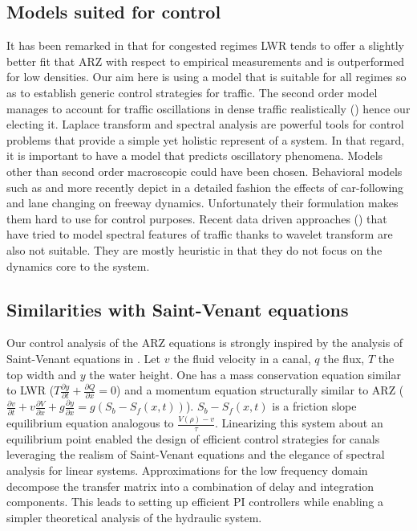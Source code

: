 \documentclass[preprint]{elsarticle}
\begin{document}
\subsection{Models suited for control}
It has been remarked in \cite{Fan} that for congested regimes
LWR tends to offer a slightly better fit that ARZ with respect to empirical
measurements and is outperformed for low densities. Our aim here is
using a model that is suitable for all regimes so as to establish
generic control strategies for traffic. The second order model
manages to account for traffic oscillations in dense traffic
realistically (\cite{Greenberg_congestionredux}) hence our electing it. Laplace transform
and spectral analysis are powerful tools for control problems that
provide a simple yet holistic represent of a system. In that regard,
it is important to have a model that predicts oscillatory
phenomena. Models other than second order macroscopic could have been
chosen. Behavioral models such as \cite{Newel} and more recently
\cite{Chen2012} depict in a detailed fashion the effects of car-following
and lane changing on freeway dynamics. Unfortunately their formulation
makes them hard to use for control purposes. Recent data driven approaches
(\cite{Zheng2011}) that have tried to model spectral features of
traffic thanks to wavelet transform are also not suitable. They are
mostly heuristic in that they do not focus on the dynamics core to the system.

\subsection{Similarities with Saint-Venant equations}
Our control analysis of the ARZ equations is strongly
inspired by the analysis of Saint-Venant equations in \cite{litrico2009modeling}.
Let $v$ the fluid velocity in a canal, $q$ the flux, $T$ the top
width and $y$ the water height. One has a mass conservation equation
similar to LWR ($T\frac{\partial y}{\partial t}+\frac{\partial Q}{\partial x}=0$)
and a momentum equation structurally similar to ARZ ($\frac{\partial v}{\partial t}+v\frac{\partial V}{\partial x}+g\frac{\partial y}{\partial x}=g\left(S_{b}-S_{f}\left(x,t\right)\right)$).
$S_{b}-S_{f}\left(x,t\right)$ is a friction slope equilibrium equation
analogous to $\frac{V\left(\rho\right)-v}{\tau}$. Linearizing this
system about an equilibrium point enabled the design of efficient
control strategies for canals leveraging the realism of Saint-Venant
equations and the elegance of spectral analysis for linear systems.
Approximations for the low frequency domain decompose the transfer
matrix into a combination of delay and integration components. This
leads to setting up efficient PI controllers while enabling a simpler
theoretical analysis of the hydraulic system.
\end{document}
